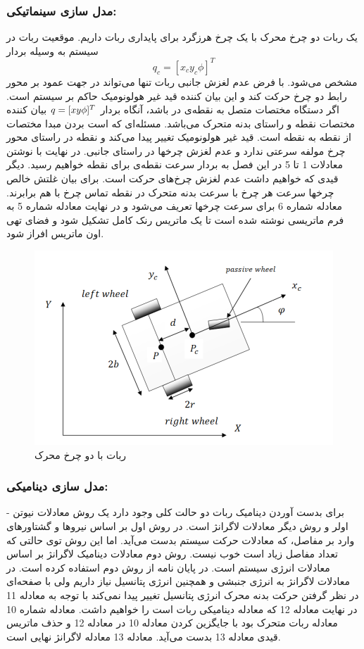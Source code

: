 \subsubsection{مدل سازی سینماتیکی:}
یک ربات دو چرخ محرک با یک چرخ هرزگرد برای پایداری ربات داریم. موقعیت ربات در سیستم
به وسیله بردار
\begin{equation*}
	{q}_{c} = [{x}_{c}  {y}_{c}  {\phi}]^T
\end{equation*}
مشخص می‌شود. با فرض عدم لغزش جانبی ربات تنها می‌تواند در جهت عمود بر محور رابط دو چرخ حرکت کند و این بیان کننده قید غیر هولونومیک حاکم بر سیستم است.
اگر دستگاه مختصات متصل به نقطه‌ی
در 
باشد، آنگاه بردار 
$
	{q} = [{x}\space{y}\space{\phi}]^T
$
بیان کننده مختصات نقطه 
و راستای بدنه متحرک می‌باشد.
مسئله‌ای که است بردن مبدا مختصات از نقطه 
به نقطه
است. قید غیر هولونومیک تغییر پیدا می‌کند و نقطه
در راستای محور چرخ مولفه سرعتی ندارد و  عدم لغزش چرخها در راستای جانبی.
در نهایت با نوشتن معادلات 1 تا 5 در این فصل به بردار سرعت نقطه‌ی برای نقطه 
خواهیم رسید.
دیگر قیدی که خواهیم داشت عدم لغزش چرخ‌های حرکت است. برای بیان غلتش خالص چرخها سرعت هر چرخ با سرعت بدنه متحرک در نقطه تماس چرخ با هم برابرند.
معادله شماره 6 برای سرعت چرخها تعریف می‌شود و در نهایت معادله شماره 5 به فرم ماتریسی نوشته شده است تا یک ماتریس رنک کامل تشکیل شود و فضای تهی اون ماتریس افراز شود.
\begin{figure}[h]
	\centering
	\includegraphics[width=0.7\linewidth]{images/1}
	\caption{ربات با دو چرخ محرک }
	\label{fig:1}
\end{figure}
\noindent\unskip

\subsubsection{مدل سازی دینامیکی:}
برای بدست آوردن دینامیک ربات دو حالت کلی وجود دارد یک روش معادلات نیوتن - اولر و روش دیگر معادلات لاگرانژ است.
در روش اول بر اساس نیروها و گشتاورهای وارد بر مفاصل، که معادلات حرکت سیستم بدست می‌آید.
اما این روش توی حالتی که تعداد مفاصل زیاد است خوب نیست.
روش دوم معادلات دینامیک لاگرانژ بر اساس معادلات انرژی سیستم است. در پایان نامه از روش دوم استفاده کرده است.
در معادلات لاگرانژ به انرژی جنبشی و همچنین انرژی پتانسیل نیاز داریم ولی با صفحه‌ای در نظر گرفتن حرکت بدنه محرک انرژی پتانسیل تغییر پیدا نمی‌کند با توجه به معادله 11 در نهایت معادله 12 که معادله دینامیکی ربات است را خواهیم داشت. معادله شماره 10 معادله ربات متحرک بود با جایگزین کردن معادله 10 در معادله 12 و حذف ماتریس قیدی معادله 13 بدست می‌آید. معادله 13 معادله لاگرانژ نهایی است.

